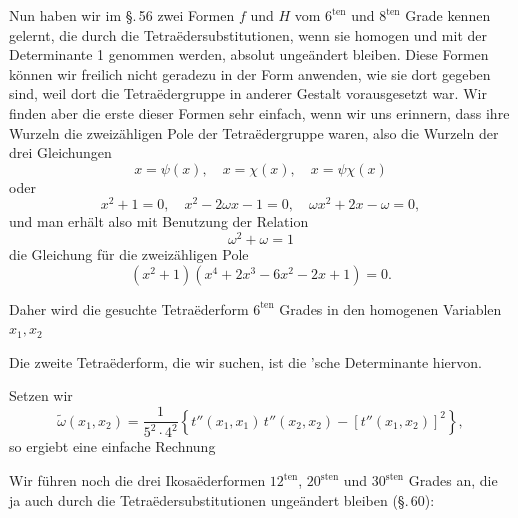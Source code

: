 Nun haben wir im \S.\,56 zwei Formen $f$ und $H$ vom $6^{\mathrm{ten}}$ und $8^{\mathrm{ten}}$ Grade kennen gelernt, die durch die Tetraëdersubstitutionen, wenn sie homogen und mit der Determinante 1 genommen werden, absolut ungeändert bleiben. Diese Formen können wir freilich nicht geradezu in der Form anwenden, wie sie dort gegeben sind, weil dort die Tetraëdergruppe in anderer Gestalt vorausgesetzt war. Wir finden aber die erste dieser Formen sehr einfach, wenn wir uns erinnern, dass ihre Wurzeln die zweizähligen Pole der Tetraëdergruppe waren, also die Wurzeln der drei Gleichungen
\[
x = \psi(x), \quad x = \chi(x), \quad x = \psi\chi(x)
\]
oder
\[
x^2 + 1 = 0, \quad x^2 - 2\omega x - 1 = 0, \quad \omega x^2 + 2x - \omega = 0,
\]
und man erhält also mit Benutzung der Relation
\[
\omega^2 + \omega = 1
\]
die Gleichung für die zweizähligen Pole
\[
(x^2+1)(x^4+2x^3-6x^2-2x+1) = 0.
\]

Daher wird die gesuchte Tetraëderform $6^{\mathrm{ten}}$ Grades in den homogenen Variablen $x_1, x_2$

Die zweite Tetraëderform, die wir suchen, ist die 'sche Determinante hiervon.

Setzen wir
\[
\tilde\omega(x_1,x_2) = \dfrac{1}{5^2 \cdot 4^2} \left\{ t''(x_1,x_1)\, t''(x_2,x_2) - [t''(x_1,x_2)]^2 \right\},
\]
so ergiebt eine einfache Rechnung

Wir führen noch die drei Ikosaëderformen $12^{\mathrm{ten}}$, $20^{\mathrm{sten}}$ und $30^{\mathrm{sten}}$ Grades an, die ja auch durch die Tetraëdersubstitutionen ungeändert bleiben (\S.\,60):
